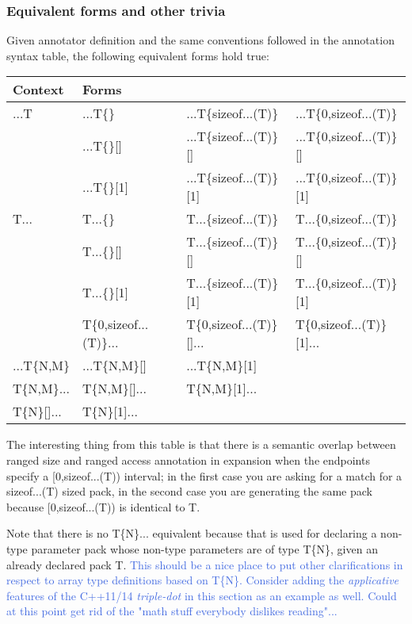 \subsubsection{Equivalent forms and other trivia}
\p Given annotator definition and the same conventions followed in the annotation syntax table, the following equivalent forms hold true:

\begin{tabularx}{\textwidth}{l | l l l}
  \textbf{Context} & \textbf{Forms} \\
\hline
   ...T & ...T\{\}    & ...T\{sizeof...(T)\}     & ...T\{0,sizeof...(T)\} \\
        & ...T\{\}[]  & ...T\{sizeof...(T)\}[]   & ...T\{0,sizeof...(T)\}[] \\
        & ...T\{\}[1] & ...T\{sizeof...(T)\}[1] & ...T\{0,sizeof...(T)\}[1] \\

   T... & T...\{\} & T...\{sizeof...(T)\} & T...\{0,sizeof...(T)\} \\
        & T...\{\}[] & T...\{sizeof...(T)\}[] & T...\{0,sizeof...(T)\}[] \\
        & T...\{\}[1] & T...\{sizeof...(T)\}[1] & T...\{0,sizeof...(T)\}[1] \\
        & T\{0,sizeof...(T)\}... & T\{0,sizeof...(T)\}[]... & T\{0,sizeof...(T)\}[1]... \\
\hline
 ...T\{N,M\} & ...T\{N,M\}[] & ...T\{N,M\}[1] \\
\hline
   T\{N,M\}... & T\{N,M\}[]... & T\{N,M\}[1]... \\
\hline
   T\{N\}[]... & T\{N\}[1]... \\
\end{tabularx}

\p The interesting thing from this table is that there is a semantic overlap between ranged size and ranged access annotation in expansion when the endpoints specify a [0,sizeof...(T)) interval;
in the first case you are asking for a match for a sizeof...(T) sized pack, in the second case you are generating the same pack because [0,sizeof...(T)) is identical to T.

\p Note that there is no T\{N\}... equivalent because that is used for declaring a non-type parameter pack whose non-type parameters are of type T\{N\}, given an already declared pack T.
\textcolor{RoyalBlue}{This should be a nice place to put other clarifications in respect to
array type definitions based on T\{N\}.
Consider adding the \textit{applicative} features of the C++11/14 \textit{triple-dot} in this section as an example as well.
Could at this point get rid of the "math stuff everybody dislikes reading"...}

